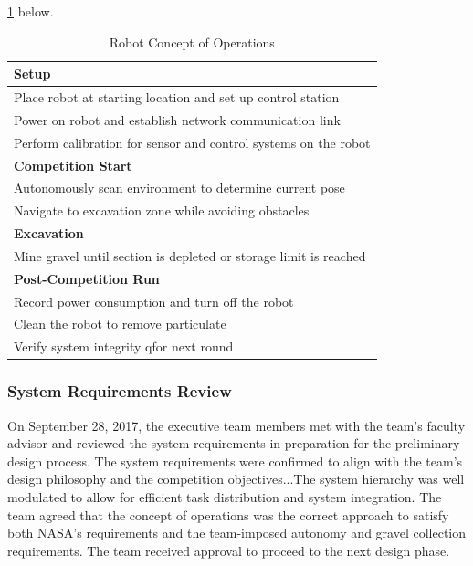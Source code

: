 \documentclass[class=article, crop=false]{standalone}
\begin{document}
	\ref{table:con_ops} below.
	\FloatBarrier
	\begin{table}[h]
	\centering
	\begin{tabular}{ | m{38em} | } 
 	\hline
 		\textbf{Setup} \\ 
 		\hline
 		Place robot at starting location and set up control station \\ 
 		\hline
 		Power on robot and establish network communication link \\ 
 		\hline
 		Perform calibration for sensor and control systems on the robot \\
 		\hline
 		\textbf{Competition Start} \\ 
 		\hline
 		Autonomously scan environment to determine current pose \\
 		\hline
 		Navigate to excavation zone while avoiding obstacles  \\
 		\hline
 		\textbf{Excavation} \\
 		\hline
		Mine gravel until section is depleted or storage limit is reached \\
 		\hline
 		\textbf{Post-Competition Run} \\
 		\hline
 		Record power consumption and turn off the robot \\
 		\hline
 		Clean the robot to remove particulate \\
 		\hline
 		Verify system integrity qfor next round \\
 		\hline
	\end{tabular}
	\caption{Robot Concept of Operations}
		\label{table:con_ops}
	\end{table}
	\FloatBarrier
	
	\subsubsection{System Requirements Review}
	On September 28, 2017, the executive team members met with the team’s faculty advisor and reviewed the system requirements in preparation for the preliminary design process. The system requirements were confirmed to align with the team’s design philosophy and the competition objectives...The system hierarchy was well modulated to allow for efficient task distribution and system integration. The team agreed that the concept of operations was the correct approach to satisfy both NASA’s requirements and the team-imposed autonomy and gravel collection requirements. The team received approval to proceed to the next design phase.



	
\end{document}
